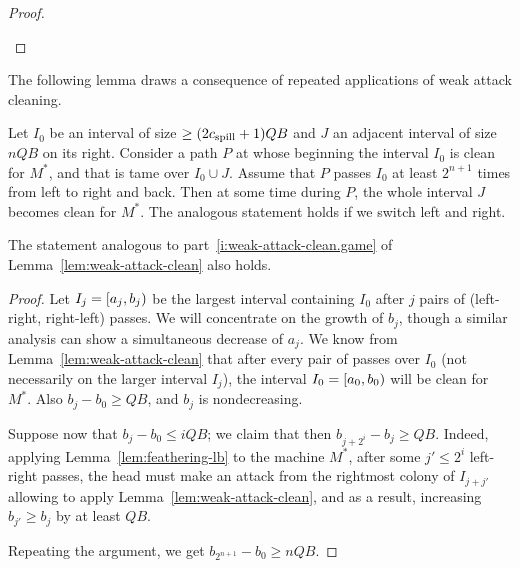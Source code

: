 \documentclass[11pt]{memoir}
\theoremstyle{definition} %
\renewcommand{\le}{\leq}
\renewcommand{\ge}{\geq}
\def\B{B}
\newcommand{\E}{E} %
\newcommand{\Q}{Q} %
\newcommand{\cns}[1]{c_{\textrm{\upshape #1}}}
\newcommand{\CSpill}{\cns{spill}}
\begin{document}
\begin{proof}
\begin{enumerate}

\end{enumerate}
\end{proof}

The following lemma draws a consequence of repeated applications of weak attack cleaning.

  \begin{lemma}\label{lem:weak-repeated-attack}
  Let \( I_{0} \) be an interval of size \(  \ge (2\CSpill+1)\Q\B \) and \( J \) an adjacent
  interval of size \( n\Q\B \) on its right.
  Consider a path \( P \) at whose beginning the interval
  \( I_{0} \) is clean for \( M^{*} \), and that is tame over \( I_{0}\cup J \).
  Assume that
  \( P \) passes \( I_{0} \) at least \( 2^{n+1} \) times from left to right and back.
  Then at some time during \( P \), the whole interval \( J \) becomes clean for \( M^{*} \).
  The analogous statement holds if we switch left and right.

  The statement analogous to part~\eqref{i:weak-attack-clean.game}
  of Lemma~\ref{lem:weak-attack-clean} also holds.
\end{lemma}
\begin{proof}
  Let \( I_{j} = \left[a_{j},b_{j}\right) \) be
  the largest interval containing \( I_{0} \) after \( j \) pairs of (left-right, right-left) passes.
  We will concentrate on the growth of \( b_{j} \), though a similar analysis can show
  a simultaneous decrease of \( a_{j} \).
  We know from Lemma~\ref{lem:weak-attack-clean} that after every pair of passes
  over \( I_{0} \) (not necessarily on the larger interval \( I_{j} \)),
  the interval \( I_{0}=\left[a_{0},b_{0}\right) \) will be clean for \( M^{*} \).
  Also \( b_{j}-b_{0}\ge \Q\B \), and  \( b_{j} \) is nondecreasing.

  Suppose now that \( b_{j}-b_{0}\le i\Q\B \);
  we claim that then \( b_{j+2^{i}}-b_{j}\ge\Q\B \).
  Indeed, applying Lemma~\ref{lem:feathering-lb} to the machine \( M^{*} \),
  after some \( j'\le 2^{i} \) left-right passes, the head must make an attack from the rightmost
  colony of \( I_{j+j'} \) allowing to apply Lemma~\ref{lem:weak-attack-clean}, and as a result,
  increasing \( b_{j'}\ge b_{j} \) by at least \( \Q\B \).

  Repeating the argument, we get \( b_{2^{n+1}}-b_{0}\ge n\Q\B \).
\end{proof}
\end{document}
